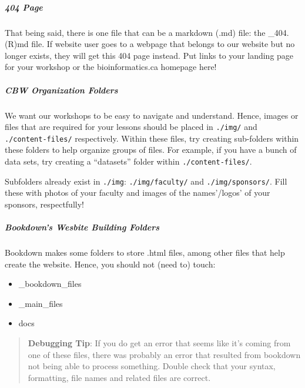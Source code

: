 \documentclass[
]{book}
\providecommand{\tightlist}{%
  \setlength{\itemsep}{0pt}\setlength{\parskip}{0pt}}
\theoremstyle{definition}
\theoremstyle{definition}
\theoremstyle{definition}
\theoremstyle{definition}
\theoremstyle{remark}
\begin{document}
\subparagraph*{\texorpdfstring{ 404 Page }{ 404 Page }}\label{page}

That being said, there is one file that can be a markdown (.md) file: the \_404.(R)md file. If website user goes to a webpage that belongs to our website but no longer exists, they will get this 404 page instead. Put links to your landing page for your workshop or the bioinformatics.ca homepage here!

\subparagraph*{\texorpdfstring{ CBW Organization Folders }{ CBW Organization Folders }}\label{cbw-organization-folders}

We want our workshops to be easy to navigate and understand. Hence, images or files that are required for your lessons should be placed in \texttt{./img/} and \texttt{./content-files/} respectively. Within these files, try creating sub-folders within these folders to help organize groups of files. For example, if you have a bunch of data sets, try creating a ``datasets'' folder within \texttt{./content-files/}.

Subfolders already exist in \texttt{./img}: \texttt{./img/faculty/} and \texttt{./img/sponsors/}. Fill these with photos of your faculty and images of the names'/logos' of your sponsors, respectfully!

\subparagraph*{\texorpdfstring{ Bookdown's Wesbite Building Folders }{ Bookdown's Wesbite Building Folders }}\label{bookdowns-wesbite-building-folders}

Bookdown makes some folders to store .html files, among other files that help create the website. Hence, you should not (need to) touch:

\begin{itemize}
\tightlist
\item
  \_bookdown\_files
\item
  \_main\_files
\item
  docs
\end{itemize}

\begin{quote}
\textbf{Debugging Tip}: If you do get an error that seems like it's coming from one of these files, there was probably an error that resulted from bookdown not being able to process something. Double check that your syntax, formatting, file names and related files are correct.
\end{quote}
\end{document}
